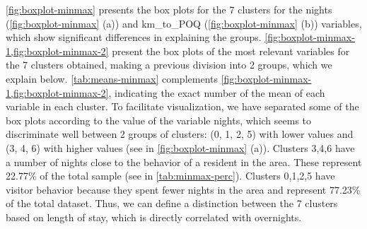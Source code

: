 \begin{table}[]
\centering
{}
\caption{Clusters based on registered resident labels using min-max normalization.}
\label{tab:minmax-perc}
\end{table}

\cref{fig:boxplot-minmax} presents the box plots for the 7 clusters for the nights (\cref{fig:boxplot-minmax} (a)) and km\_to\_POQ (\cref{fig:boxplot-minmax} (b)) variables, which show significant differences in explaining the groups. \cref{fig:boxplot-minmax-1,fig:boxplot-minmax-2} present the box plots of the most relevant variables for the 7 clusters obtained, making a previous division into 2 groups, which we explain below. \cref{tab:means-minmax} complements \cref{fig:boxplot-minmax-1,fig:boxplot-minmax-2}, indicating the exact number of the mean of each variable in each cluster. To facilitate visualization, we have separated some of the box plots according to the value of the variable nights, which seems to discriminate well between 2 groups of clusters: (0, 1, 2, 5) with lower values and (3, 4, 6) with higher values (see in \cref{fig:boxplot-minmax} (a)). Clusters 3,4,6 have a number of nights close to the behavior of a resident in the area. These represent 22.77\% of the total sample (see in \cref{tab:minmax-perc}). Clusters 0,1,2,5 have visitor behavior because they spent fewer nights in the area and represent 77.23\% of the total dataset. Thus, we can define a distinction between the 7 clusters based on length of stay, which is directly correlated with overnights.

